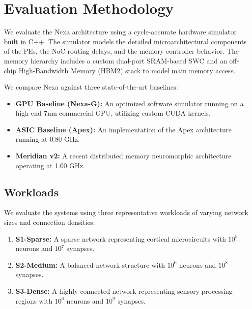\section{Evaluation Methodology}
We evaluate the Nexa architecture using a cycle-accurate hardware simulator built in C++. The simulator models the detailed microarchitectural components of the PEs, the NoC routing delays, and the memory controller behavior. The memory hierarchy includes a custom dual-port SRAM-based SWC and an off-chip High-Bandwidth Memory (HBM2) stack to model main memory access.

We compare Nexa against three state-of-the-art baselines:
\begin{itemize}
  \item \textbf{GPU Baseline (Nexa-G):} An optimized software simulator running on a high-end 7nm commercial GPU, utilizing custom CUDA kernels.
  \item \textbf{ASIC Baseline (Apex):} An implementation of the Apex architecture~\cite{apex2021} running at 0.80 GHz.
  \item \textbf{Meridian v2:} A recent distributed memory neuromorphic architecture~\cite{meridian2023} operating at 1.00 GHz.
\end{itemize}

\subsection{Workloads}
We evaluate the systems using three representative workloads of varying network sizes and connection densities:
\begin{enumerate}
  \item \textbf{S1-Sparse:} A sparse network representing cortical microcircuits with $10^5$ neurons and $10^7$ synapses.
  \item \textbf{S2-Medium:} A balanced network structure with $10^6$ neurons and $10^8$ synapses.
  \item \textbf{S3-Dense:} A highly connected network representing sensory processing regions with $10^6$ neurons and $10^9$ synapses.
\end{enumerate}

